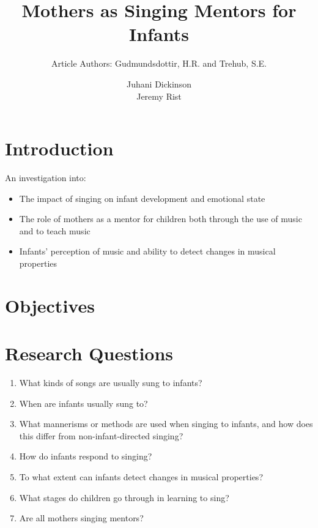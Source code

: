 \documentclass{beamer}
\title{Mothers as Singing Mentors for Infants}
\subtitle{Article Authors: Gudmundsdottir, H.R. and Trehub, S.E.}
\author[Juhani Dickinson, Jeremy Rist]{Juhani Dickinson \\ Jeremy Rist}
\begin{document}
\begin{frame}
	\titlepage
\end{frame}


\section{Introduction}
\begin{frame}
	An investigation into:
	\begin{itemize}
	\item The impact of singing on infant development and emotional state
	\item The role of mothers as a mentor for children both through the use of music and to teach music
	\item Infants' perception of music and ability to detect changes in musical properties
	\end{itemize}
\end{frame}

\section{Objectives}
\begin{frame}
\end{frame}

\section{Research Questions}
\begin{frame}
	\begin{enumerate}
		\item What kinds of songs are usually sung to infants?
		\item When are infants usually sung to?
		\item What mannerisms or methods are used when singing to infants, and how does this differ from non-infant-directed singing?
		\item How do infants respond to singing?
		\item To what extent can infants detect changes in musical properties?
		\item What stages do children go through in learning to sing?
		\item Are all mothers singing mentors?
	\end{enumerate}
\end{frame}
\end{document}
